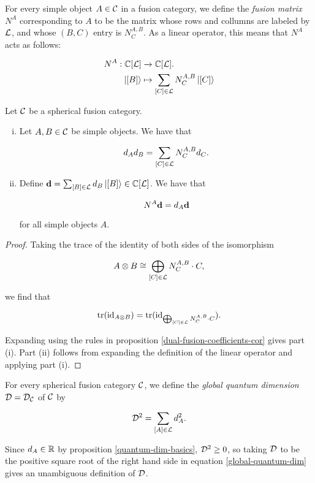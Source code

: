 \begin{defn} For every simple object $A\in {\mathcal C}$ in a fusion category, we define the {\em fusion matrix} $N^{A}$ corresponding to $A$ to be the matrix whose rows and collumns are labeled by ${\mathcal L}$, and whose $(B,C)$ entry is $N^{A,B}_{C}$. As a linear operator, this means that $N^{A}$ acts as follows:

 \begin{align*}
N^{A}:{\mathbb C}[{\mathcal L}]&\xrightarrow{} {\mathbb C}[{\mathcal L}].\\
\ket{[B]}&\mapsto \sum_{[C]\in {\mathcal L}} N^{A,B}_C \ket{[C]}
\end{align*}
\end{defn}

\begin{prop}\label{quantum-dim-fusion-rule} Let ${\mathcal C}$ be a spherical fusion category.

\begin{enumerate}[(i)]
\item Let $A,B\in {\mathcal C}$ be simple objects. We have that

$$d_Ad_B=\sum_{[C]\in {\mathcal L}}N^{A,B}_C d_C.$$

\item Define $\bold{d} = \sum_{[B]\in {\mathcal L}} d_{B}\ket{[B]}\in {\mathbb C}[{\mathcal L}]$. We have that

$$N^{A}\bold{d}=d_{A}\bold{d}$$

for all simple objects $A$.

\end{enumerate}

\end{prop}
\begin{proof} Taking the trace of the identity of both sides of the isomorphism

$$A\otimes B \cong \bigoplus_{[C]\in {\mathcal L}}N^{A,B}_{C}\cdot C,$$

we find that

$$\operatorname{tr}(\operatorname{id}_{A\otimes B})=\operatorname{tr}(\operatorname{id}_{\bigoplus_{[C]\in {\mathcal L}}N^{A,B}_{C}\cdot C}).$$

Expanding using the rules in proposition \ref{dual-fusion-coefficients-cor} gives part (i). Part (ii) follows from expanding the definition of the linear operator and applying part (i).
\end{proof}

\begin{defn} For every spherical fusion category ${\mathcal C}$, we define the {\em global quantum dimension} ${\mathcal D}={\mathcal D}_{{\mathcal C}}$ of ${\mathcal C}$ by

\begin{equation}\label{global-quantum-dim}
{\mathcal D}^2=\sum_{[A]\in{\mathcal L}}d_{A}^2.
\end{equation}

Since $d_A\in {\mathbb R}$ by proposition \ref{quantum-dim-basics}, ${\mathcal D}^2\geq 0$, so taking ${\mathcal D}$ to be the positive square root of the right hand side in equation \ref{global-quantum-dim} gives an unambiguous definition of ${\mathcal D}$.
\end{defn}

